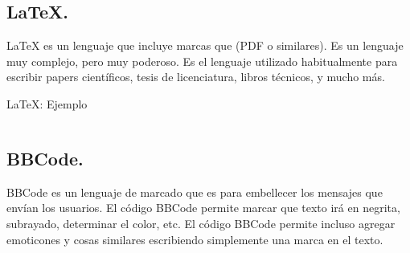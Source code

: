 
\subsection{LaTeX.}


\begin{frame}{LaTeX}
   es un lenguaje que incluye marcas que  (PDF o similares).
  \jump
  Es un lenguaje muy complejo, pero muy poderoso.
  \jump
  Es el lenguaje utilizado habitualmente para escribir papers científicos, tesis
  de licenciatura, libros técnicos, y mucho más.
  \jump
  \textit{}
\end{frame}


\begin{frame}{LaTeX: Ejemplo}
  \begin{columns}
    \begin{column}{0.5\textwidth}
    \end{column}
    \begin{column}{0.5\textwidth}
    \end{column}
  \end{columns}
\end{frame}


\subsection{BBCode.}


\begin{frame}{BBCode}
   es un lenguaje de marcado que es  para embellecer los mensajes que envían los usuarios.
  \jump
  El código BBCode permite marcar que texto irá en negrita, subrayado, determinar
  el color, etc.
  \jump
  El código BBCode permite incluso agregar emoticones y cosas similares
  escribiendo simplemente una marca en el texto.
\end{frame}


